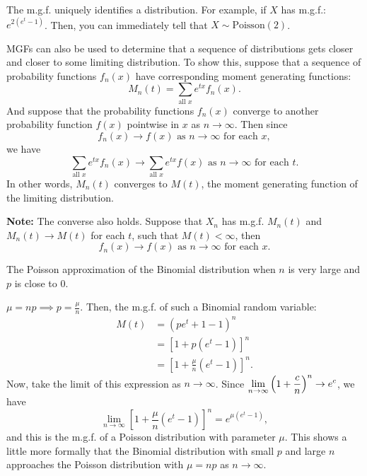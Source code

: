 The m.g.f. uniquely identifies a distribution. For example, if $X$ has m.g.f.: $e^{2(e^t -1)}$. Then, you can immediately tell that $X \sim \text{Poisson}(2)$.

MGFs can also be used to determine that a sequence of distributions gets closer and closer to some limiting distribution. To show this, suppose that a sequence of probability functions $f_n(x)$ have corresponding moment generating functions: \vspace{-3mm}
\[
    M_n(t) = \displaystyle \sum_{\text{all $x$}} e^{tx} f_n(x).
\]
And suppose that the probability functions $f_n(x)$ converge to another probability function $f(x)$ pointwise in $x$ as $n \to \infty$. Then since
\vspace{-3mm}
\[
    f_n(x) \to f(x) \text{ as $n \to \infty$ for each $x$},
\]
we have \vspace{-3mm}
\[
    \sum_{\text{all $x$}} e^{tx} f_n(x) \to \sum_{\text{all $x$}} e^{tx} f(x) \text{ as $n \to \infty$ for each $t$}.
\]
In other words, $M_n(t)$ converges to $M(t)$, the moment generating function of the limiting distribution.

\textbf{Note:} The converse also holds. Suppose that $X_n$ has m.g.f. $M_n(t)$ and $M_n(t) \to M(t)$ for each $t$, such that $M(t) < \infty$, then
\vspace{-3mm}
\[
    f_n(x) \to f(x) \text{ as $n \to \infty$ for each $x$}.
\]

\begin{example}
    The Poisson approximation of the Binomial distribution when $n$ is very large and $p$ is close to 0.

    $\mu = np \implies p = \frac{\mu}{n}$. Then, the m.g.f. of such a Binomial random variable:
    \begin{align*}
        M(t) &= (pe^t + 1 - 1)^n \\
        &= \left[ 1 + p(e^t -1) \right]^n \\
        &= \left[ 1 + \frac{\mu}{n} (e^t -1) \right]^n.
    \end{align*}
    Now, take the limit of this expression as $n \to \infty$. Since $\displaystyle \lim_{n \to \infty} \left( 1 + \frac{c}{n} \right)^n \to e^c$, we have
    \[
        \lim_{n \to \infty} \left[ 1 + \frac{\mu}{n} (e^t -1) \right]^n = e^{\mu(e^t -1)},
    \]
    and this is the m.g.f. of a Poisson distribution with parameter $\mu$. This shows a little more formally that the Binomial distribution with small $p$ and large $n$ approaches the Poisson distribution with $\mu = np$  as $n \to \infty$.
\end{example}


